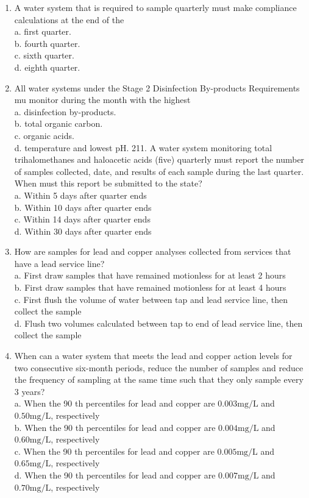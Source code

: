 \documentclass[10pt]{article}
\begin{document}
\begin{enumerate}
  \item A water system that is required to sample quarterly must make compliance calculations at the end of the\\
a. first quarter.\\
b. fourth quarter.\\
c. sixth quarter.\\
d. eighth quarter.

  \item All water systems under the Stage 2 Disinfection By-products Requirements mu monitor during the month with the highest\\
a. disinfection by-products.\\
b. total organic carbon.\\
c. organic acids.\\
d. temperature and lowest $\mathrm{pH}$. 211. A water system monitoring total trihalomethanes and haloacetic acids (five) quarterly must report the number of samples collected, date, and results of each sample during the last quarter. When must this report be submitted to the state?\\
a. Within 5 days after quarter ends\\
b. Within 10 days after quarter ends\\
c. Within 14 days after quarter ends\\
d. Within 30 days after quarter ends

  \item How are samples for lead and copper analyses collected from services that have a lead service line?\\
a. First draw samples that have remained motionless for at least 2 hours\\
b. First draw samples that have remained motionless for at least 4 hours\\
c. First flush the volume of water between tap and lead service line, then collect the sample\\
d. Flush two volumes calculated between tap to end of lead service line, then collect the sample

  \item When can a water system that meets the lead and copper action levels for two consecutive six-month periods, reduce the number of samples and reduce the frequency of sampling at the same time such that they only sample every 3 years?\\
a. When the 90 th percentiles for lead and copper are $0.003 \mathrm{mg} / \mathrm{L}$ and $0.50 \mathrm{mg} / \mathrm{L}$, respectively\\
b. When the 90 th percentiles for lead and copper are $0.004 \mathrm{mg} / \mathrm{L}$ and $0.60 \mathrm{mg} / \mathrm{L}$, respectively\\
c. When the 90 th percentiles for lead and copper are $0.005 \mathrm{mg} / \mathrm{L}$ and $0.65 \mathrm{mg} / \mathrm{L}$, respectively\\
d. When the 90 th percentiles for lead and copper are $0.007 \mathrm{mg} / \mathrm{L}$ and $0.70 \mathrm{mg} / \mathrm{L}$, respectively


\end{enumerate}
\end{document}
